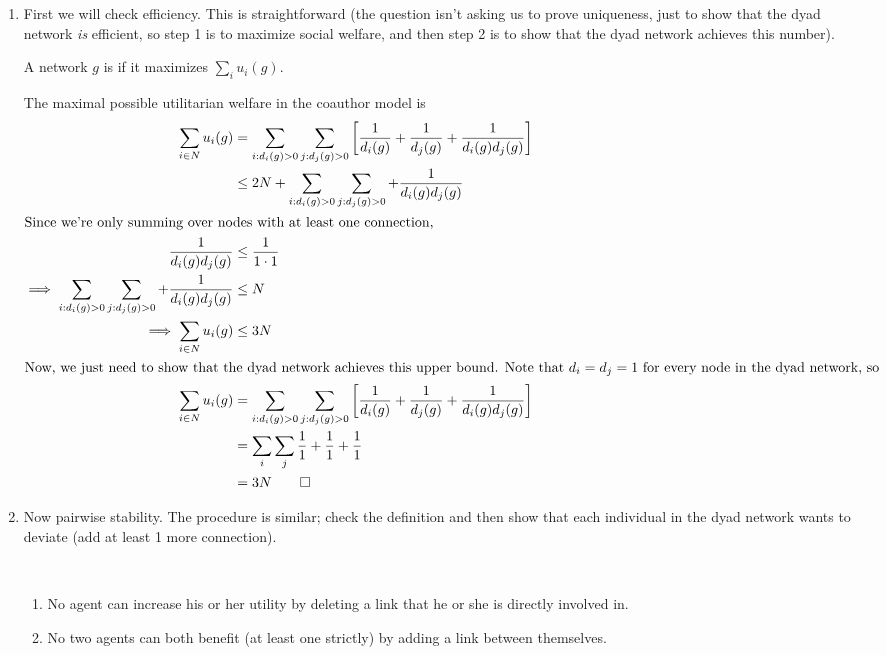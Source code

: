 \begin{enumerate}
\item First we will check efficiency. This is straightforward (the question isn't asking us to prove uniqueness, just to show that the dyad network \emph{is} efficient, so step 1 is to maximize social welfare, and then step 2 is to show that the dyad network achieves this number).
  \begin{definition}
    A network $g$ is  if it maximizes $\sum_i u_i (g)$.
  \end{definition}
  The maximal possible utilitarian welfare in the coauthor model is
  \begin{align*}
    \sum_{i \in N} u_i(g) &= \sum_{i:d_i(g) > 0} \sum_{j: d_j (g) > 0} \left[\frac{1}{d_i(g)} + \frac{1}{d_j(g)} + \frac{1}{d_i(g) d_j(g)}\right]\\
    &\le 2N + \sum_{i:d_i(g) > 0} \sum_{j: d_j (g) > 0} + \frac{1}{d_i(g) d_j(g)}\\
    \intertext{Since we're only summing over nodes with at least one connection,}
    \frac{1}{d_i(g) d_j(g)} & \le \frac{1}{1 \cdot 1}\\
    \implies \sum_{i:d_i(g) > 0} \sum_{j: d_j (g) > 0} + \frac{1}{d_i(g) d_j(g)} &\le N\\
    \implies \sum_{i \in N} u_i(g) &\le 3N\\
    \intertext{Now, we just need to show that the dyad network achieves this upper bound. Note that $d_i = d_j = 1$ for every node in the dyad network, so}
    \sum_{i \in N} u_i(g) &= \sum_{i:d_i(g) > 0} \sum_{j: d_j (g) > 0} \left[\frac{1}{d_i(g)} + \frac{1}{d_j(g)} + \frac{1}{d_i(g) d_j(g)}\right]\\
                          &= \sum_i \sum_j \frac{1}{1} + \frac{1}{1} + \frac{1}{1}\\
    &= 3N \qed
  \end{align*}
  \item Now pairwise stability. The procedure is similar; check the definition and then show that each individual in the dyad network wants to deviate (add at least 1 more connection).
    \begin{definition}
      $ $
      \begin{enumerate}
      \item No agent can increase his or her utility by deleting a link that he or she is directly involved in.
        \item No two agents can both benefit (at least one strictly) by adding a link between themselves.

\end{enumerate}
\end{definition}
\end{enumerate}
